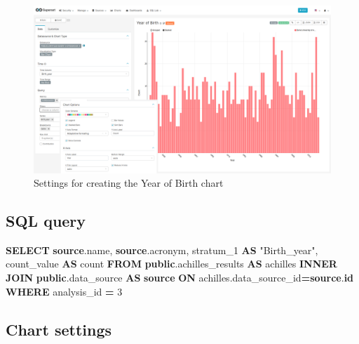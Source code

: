\documentclass[
]{book}
\newenvironment{Shaded}{\begin{snugshade}}{\end{snugshade}}
\newcommand{\DecValTok}[1]{\textcolor[rgb]{0.00,0.00,0.81}{#1}}
\newcommand{\FunctionTok}[1]{\textcolor[rgb]{0.00,0.00,0.00}{#1}}
\newcommand{\KeywordTok}[1]{\textcolor[rgb]{0.13,0.29,0.53}{\textbf{#1}}}
\newcommand{\NormalTok}[1]{#1}
\newcommand{\OperatorTok}[1]{\textcolor[rgb]{0.81,0.36,0.00}{\textbf{#1}}}
\newcommand{\OtherTok}[1]{\textcolor[rgb]{0.56,0.35,0.01}{#1}}
\begin{document}
\begin{figure}
\includegraphics[width=1\linewidth]{images/04-person/04-year_of_birth} \caption{Settings for creating the Year of Birth chart}\label{fig:yearOfBirth}
\end{figure}

\hypertarget{sql-query-10}{%
\subsection{SQL query}\label{sql-query-10}}

\begin{Shaded}
\begin{Highlighting}[]
\KeywordTok{SELECT} \KeywordTok{source}\NormalTok{.name,}
       \KeywordTok{source}\NormalTok{.acronym,}
\NormalTok{       stratum\_1 }\KeywordTok{AS} \OtherTok{"Birth\_year"}\NormalTok{,}
\NormalTok{       count\_value }\KeywordTok{AS} \FunctionTok{count}
\KeywordTok{FROM} \KeywordTok{public}\NormalTok{.achilles\_results }\KeywordTok{AS}\NormalTok{ achilles}
\KeywordTok{INNER} \KeywordTok{JOIN} \KeywordTok{public}\NormalTok{.data\_source }\KeywordTok{AS} \KeywordTok{source} \KeywordTok{ON}\NormalTok{ achilles.data\_source\_id}\OperatorTok{=}\KeywordTok{source}\NormalTok{.}\KeywordTok{id}
\KeywordTok{WHERE}\NormalTok{ analysis\_id }\OperatorTok{=} \DecValTok{3}
\end{Highlighting}
\end{Shaded}

\hypertarget{chart-settings-10}{%
\subsection{Chart settings}\label{chart-settings-10}}
\end{document}
